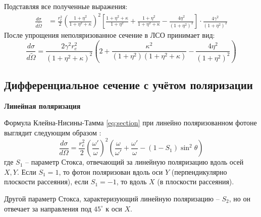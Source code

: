 \documentclass[14pt, a4paper]{extreport}
\begin{document}
Подставляя все полученные выражения:
\begin{align}
    \frac{d\sigma}{d\tilde{\Omega}} &= \frac{r_e^2}{2} \left( \frac{1+\eta^2}{1+\eta^2+\kappa} \right)^2 
    \left[ \frac{1+\eta^2+\kappa}{1+\eta^2} + \frac{1+\eta^2}{1+\eta^2+\kappa} - \frac{4\eta^2}{(1+\eta^2)^2} \right] 
    \cdot \frac{4\gamma^2}{(1+\eta^2)^2}
\end{align}
После упрощения неполяризованное сечение в ЛСО принимает вид:
\begin{equation}
    \frac{d\sigma}{d\tilde{\Omega}} = \frac{2\gamma^2 r_e^2}{(1+\eta^2+\kappa)^2} 
    \left( 2 + \frac{\kappa^2}{(1+\eta^2)(1+\eta^2+\kappa)} - \frac{4\eta^2}{(1+\eta^2)^2} \right)
\end{equation}
\subsection{Дифференциальное сечение с учётом поляризации}

\textbf{Линейная поляризация}

Формула Клейна-Нисины-Тамма \eqref{eq:section} при линейно поляризованном фотоне выглядит следующим образом \cite{lifshitz}:
\begin{equation}
\label{eq:section_l}
    \frac{d\sigma}{d\Omega} = \frac{r_e^2}{2} \left( \frac{\omega'}{\omega} \right)^2 
    \left( \frac{\omega}{\omega'} + \frac{\omega'}{\omega} - (1-S_1)\sin^2\theta \right)
\end{equation}
где $S_1$ -- параметр Стокса, отвечающий за линейную поляризацию вдоль осей $X, Y$. Если $S_1=1$, то фотон поляризован вдоль оси $Y$ (перпендикулярно плоскости рассеяния), если $S_1 = -1$, то вдоль $X$ (в плоскости рассеяния).

Другой параметр Стокса, характеризующий линейную поляризацию -- $S_2$, но он отвечает за направления под $45^\circ$ к оси $X$.
\end{document}
